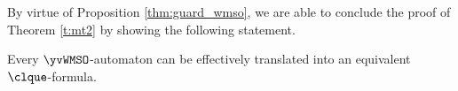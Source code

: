 By virtue of Proposition \ref{thm:guard_wmso}, we are able to conclude the proof of Theorem \ref{t:mt2} by showing the following statement.
\begin{proposition}\label{thm:wmsoauttof}
Every $\yvWMSO$-automaton can be effectively translated into an equivalent $\clque$-formula.
\end{proposition}
%
%
%
%
